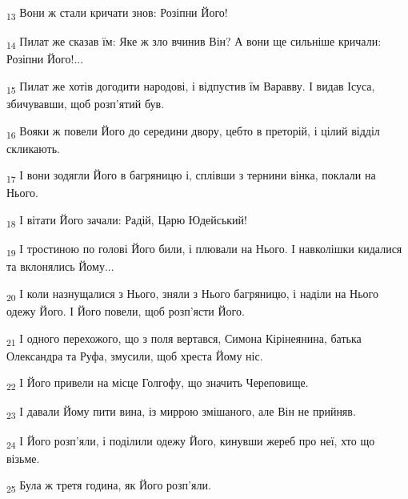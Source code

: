 \begin{tcolorbox}
\textsubscript{13} Вони ж стали кричати знов: Розіпни Його!
\end{tcolorbox}
\begin{tcolorbox}
\textsubscript{14} Пилат же сказав їм: Яке ж зло вчинив Він? А вони ще сильніше кричали: Розіпни Його!...
\end{tcolorbox}
\begin{tcolorbox}
\textsubscript{15} Пилат же хотів догодити народові, і відпустив їм Варавву. І видав Ісуса, збичувавши, щоб розп'ятий був.
\end{tcolorbox}
\begin{tcolorbox}
\textsubscript{16} Вояки ж повели Його до середини двору, цебто в преторій, і цілий відділ скликають.
\end{tcolorbox}
\begin{tcolorbox}
\textsubscript{17} І вони зодягли Його в багряницю і, сплівши з тернини вінка, поклали на Нього.
\end{tcolorbox}
\begin{tcolorbox}
\textsubscript{18} І вітати Його зачали: Радій, Царю Юдейський!
\end{tcolorbox}
\begin{tcolorbox}
\textsubscript{19} І тростиною по голові Його били, і плювали на Нього. І навколішки кидалися та вклонялись Йому...
\end{tcolorbox}
\begin{tcolorbox}
\textsubscript{20} І коли назнущалися з Нього, зняли з Нього багряницю, і наділи на Нього одежу Його. І Його повели, щоб розп'ясти Його.
\end{tcolorbox}
\begin{tcolorbox}
\textsubscript{21} І одного перехожого, що з поля вертався, Симона Кірінеянина, батька Олександра та Руфа, змусили, щоб хреста Йому ніс.
\end{tcolorbox}
\begin{tcolorbox}
\textsubscript{22} І Його привели на місце Голгофу, що значить Череповище.
\end{tcolorbox}
\begin{tcolorbox}
\textsubscript{23} І давали Йому пити вина, із миррою змішаного, але Він не прийняв.
\end{tcolorbox}
\begin{tcolorbox}
\textsubscript{24} І Його розп'яли, і поділили одежу Його, кинувши жереб про неї, хто що візьме.
\end{tcolorbox}
\begin{tcolorbox}
\textsubscript{25} Була ж третя година, як Його розп'яли.
\end{tcolorbox}
